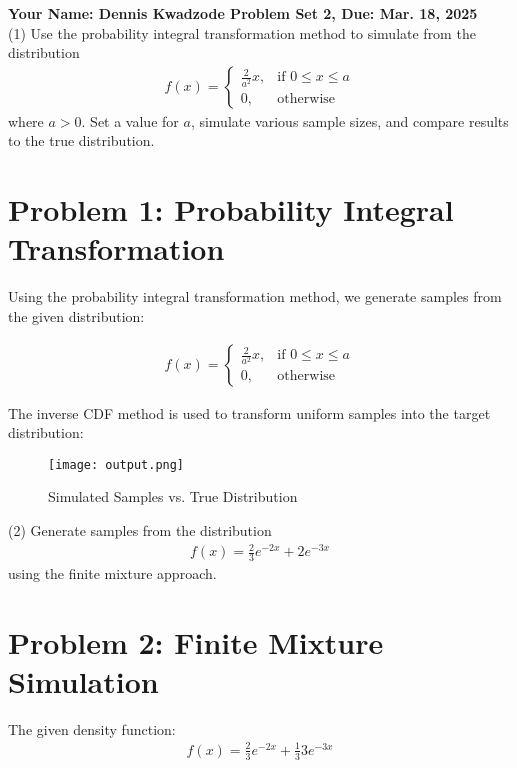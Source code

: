 \documentclass[final,11pt]{article}
\begin{document}
\thispagestyle{empty}
\begin{spacing}{1.25}

\textbf{Your Name: Dennis Kwadzode \hfill Problem Set 2, Due: Mar. 18, 2025}\\

(1) Use the probability integral transformation method to simulate from the distribution
\begin{gather}
    f(x) = 
    \begin{cases}
        \frac{2}{a^2}x,  & \text{if }0\leq x\leq a \\
        0, & \text{otherwise}
    \end{cases}
\end{gather}
where $a>0$. Set a value for $a$, simulate various sample sizes, and compare results to the true distribution.
\section*{Problem 1: Probability Integral Transformation}
Using the probability integral transformation method, we generate samples from the given distribution:

\begin{gather}
    f(x) = 
    \begin{cases}
        \frac{2}{a^2}x,  & \text{if } 0\leq x\leq a \\
        0, & \text{otherwise}
    \end{cases}
\end{gather}

The inverse CDF method is used to transform uniform samples into the target distribution:

\begin{figure}
    \centering
    \texttt{[image: output.png]}
    \caption{Simulated Samples vs. True Distribution}
\end{figure}
\newpage

(2) Generate samples from the distribution
\begin{gather}
    f(x)=\frac{2}{3}e^{-2x}+2e^{-3x}
\end{gather}
using the finite mixture approach.
\section*{Problem 2: Finite Mixture Simulation}
The given density function:
\begin{gather}
    f(x) = \frac{2}{3} e^{-2x} + \frac{1}{3} 3 e^{-3x}
\end{gather}


\end{spacing}
\end{document}
